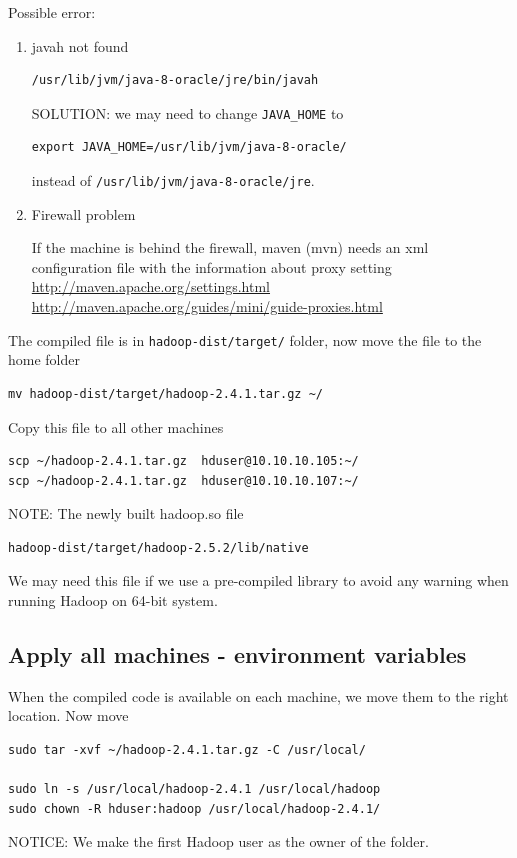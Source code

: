 Possible error:
\begin{enumerate}
  \item javah not found
\begin{verbatim}
/usr/lib/jvm/java-8-oracle/jre/bin/javah
\end{verbatim}
SOLUTION: we may need to change \verb!JAVA_HOME! to
\begin{verbatim}
export JAVA_HOME=/usr/lib/jvm/java-8-oracle/
\end{verbatim}
instead of \verb!/usr/lib/jvm/java-8-oracle/jre!.

 \item Firewall problem

If the machine is behind the firewall, maven (mvn) needs an xml configuration
file with the information about proxy setting
\url{http://maven.apache.org/settings.html} 
\url{http://maven.apache.org/guides/mini/guide-proxies.html}
\end{enumerate}


The compiled file is in  \verb!hadoop-dist/target/! folder, now move the file to
the home folder
\begin{verbatim}
mv hadoop-dist/target/hadoop-2.4.1.tar.gz ~/
\end{verbatim}

Copy this file to all other machines
\begin{verbatim}
scp ~/hadoop-2.4.1.tar.gz  hduser@10.10.10.105:~/
scp ~/hadoop-2.4.1.tar.gz  hduser@10.10.10.107:~/
\end{verbatim}

NOTE: The newly built hadoop.so file 
\begin{verbatim}
hadoop-dist/target/hadoop-2.5.2/lib/native
\end{verbatim}
We may need this file if we use a pre-compiled library to avoid any warning when
running Hadoop on 64-bit system.

\subsection{Apply all machines - environment variables}

When the compiled code is available on each machine, we move them to the right
location. Now move
\begin{verbatim}
sudo tar -xvf ~/hadoop-2.4.1.tar.gz -C /usr/local/

sudo ln -s /usr/local/hadoop-2.4.1 /usr/local/hadoop
sudo chown -R hduser:hadoop /usr/local/hadoop-2.4.1/
\end{verbatim}
NOTICE: We make the first Hadoop user as the owner of the folder.

